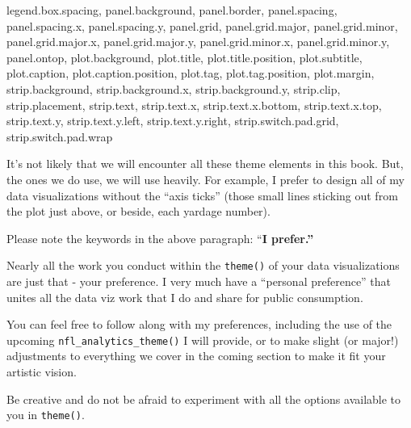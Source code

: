 \documentclass[
  letterpaper,
]{krantz}
\newenvironment{Shaded}{\begin{snugshade}}{\end{snugshade}}
\newcommand{\NormalTok}[1]{\textcolor[rgb]{0.00,0.23,0.31}{#1}}
\begin{document}
\begin{Shaded}
\begin{Highlighting}[]
\NormalTok{  legend.box.spacing,}
\NormalTok{  panel.background,}
\NormalTok{  panel.border,}
\NormalTok{  panel.spacing,}
\NormalTok{  panel.spacing.x,}
\NormalTok{  panel.spacing.y,}
\NormalTok{  panel.grid,}
\NormalTok{  panel.grid.major,}
\NormalTok{  panel.grid.minor,}
\NormalTok{  panel.grid.major.x,}
\NormalTok{  panel.grid.major.y,}
\NormalTok{  panel.grid.minor.x,}
\NormalTok{  panel.grid.minor.y,}
\NormalTok{  panel.ontop,}
\NormalTok{  plot.background,}
\NormalTok{  plot.title,}
\NormalTok{  plot.title.position,}
\NormalTok{  plot.subtitle,}
\NormalTok{  plot.caption,}
\NormalTok{  plot.caption.position,}
\NormalTok{  plot.tag,}
\NormalTok{  plot.tag.position,}
\NormalTok{  plot.margin,}
\NormalTok{  strip.background,}
\NormalTok{  strip.background.x,}
\NormalTok{  strip.background.y,}
\NormalTok{  strip.clip,}
\NormalTok{  strip.placement,}
\NormalTok{  strip.text,}
\NormalTok{  strip.text.x,}
\NormalTok{  strip.text.x.bottom,}
\NormalTok{  strip.text.x.top,}
\NormalTok{  strip.text.y,}
\NormalTok{  strip.text.y.left,}
\NormalTok{  strip.text.y.right,}
\NormalTok{  strip.switch.pad.grid,}
\NormalTok{  strip.switch.pad.wrap}
\end{Highlighting}
\end{Shaded}

It's not likely that we will encounter all these theme elements in this
book. But, the ones we do use, we will use heavily. For example, I
prefer to design all of my data visualizations without the ``axis
ticks'' (those small lines sticking out from the plot just above, or
beside, each yardage number).

\begin{tcolorbox}[enhanced jigsaw, colback=white, leftrule=.75mm, breakable, colframe=quarto-callout-tip-color-frame, bottomtitle=1mm, rightrule=.15mm, left=2mm, opacityback=0, bottomrule=.15mm, arc=.35mm, coltitle=black, colbacktitle=quarto-callout-tip-color!10!white, toptitle=1mm, titlerule=0mm, title=\textcolor{quarto-callout-tip-color}{\faLightbulb}\hspace{0.5em}{Tip}, toprule=.15mm, opacitybacktitle=0.6]

Please note the keywords in the above paragraph: ``\textbf{I prefer.''}

Nearly all the work you conduct within the \texttt{theme()} of your data
visualizations are just that - your preference. I very much have a
``personal preference'' that unites all the data viz work that I do and
share for public consumption.

You can feel free to follow along with my preferences, including the use
of the upcoming \texttt{nfl\_analytics\_theme()} I will provide, or to
make slight (or major!) adjustments to everything we cover in the coming
section to make it fit your artistic vision.

Be creative and do not be afraid to experiment with all the options
available to you in \texttt{theme()}.

\end{tcolorbox}
\end{document}
